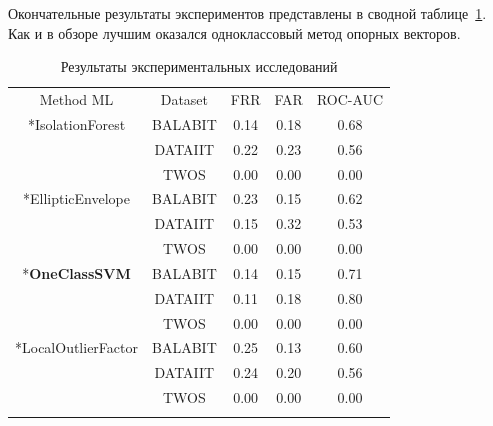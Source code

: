 \documentclass[12pt]{article}
\begin{document}
    \par Окончательные результаты экспериментов представлены в сводной таблице~\ref{sec:PracticalPart:table:Result}. Как и в обзоре лучшим оказался одноклассовый метод опорных векторов.

    \begin{table}[h]
        \centering
        \renewcommand{\arraystretch}{1.25}
        \renewcommand{\tabcolsep}{5mm}
        \caption{Результаты экспериментальных исследований}
        \begin{tabular}{|| c || c || c | c | c ||}
            \hhline{|t:=:t:=:t:===:t|} 
            Method ML & Dataset & FRR & FAR & ROC-AUC \\
            \hhline{|:=::=::===:|}
            \multirow{3}*{IsolationForest}      & BALABIT & 0.14 & 0.18 & \cellcolor{yellow} 0.68 \\ \hhline{||~||-||-|-|-||}
                                                & DATAIIT & 0.22 & 0.23 & \cellcolor{pink}   0.56 \\ \hhline{||~||-||-|-|-||}
                                                & TWOS    & 0.00 & 0.00 & \cellcolor{white}  0.00 \\ \hhline{||-||-||-|-|-||}
            \multirow{3}*{EllipticEnvelope}     & BALABIT & 0.23 & 0.15 & \cellcolor{yellow} 0.62 \\ \hhline{||~||-||-|-|-||}
                                                & DATAIIT & 0.15 & 0.32 & \cellcolor{pink}   0.53 \\ \hhline{||~||-||-|-|-||}
                                                & TWOS    & 0.00 & 0.00 & \cellcolor{white}  0.00 \\ \hhline{||-||-||-|-|-||}
            \multirow{3}*{\textbf{OneClassSVM}} & BALABIT & 0.14 & 0.15 & \cellcolor{lime}   0.71 \\ \hhline{||~||-||-|-|-||}
                                                & DATAIIT & 0.11 & 0.18 & \cellcolor{lime}   0.80 \\ \hhline{||~||-||-|-|-||}
                                                & TWOS    & 0.00 & 0.00 & \cellcolor{white}  0.00 \\ \hhline{||-||-||-|-|-||}
            \multirow{3}*{LocalOutlierFactor}   & BALABIT & 0.25 & 0.13 & \cellcolor{yellow} 0.60 \\ \hhline{||~||-||-|-|-||}
                                                & DATAIIT & 0.24 & 0.20 & \cellcolor{pink}   0.56 \\ \hhline{||~||-||-|-|-||}
                                                & TWOS    & 0.00 & 0.00 & \cellcolor{white}  0.00 \\
            \hhline{|b:=:b:=:b:===:b|} 
        \end{tabular}
        \label{sec:PracticalPart:table:Result}
    \end{table}
\end{document}
